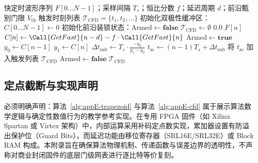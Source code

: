 \begin{algorithm}[!htbp]
\caption{数字恒比定时（CFD）与线性过零插值参考算法}\label{alg:appE-cfd}
\begin{algorithmic}[1]
\Require 快定时波形序列 $F[0 \dots N-1]$；采样间隔 $T_s$；恒比分数 $f$；延迟周期 $d$；前沿甄别门限 $V_{\mathrm{th}}$
\Ensure 触发时刻列表 $\mathcal{T}_{\mathrm{CFD}} = \{t_1, t_2, \dots\}$
\State 初始化双极性缓冲区：$C[0 \dots N-1] \gets 0$
\State 初始化前沿装锁状态：$\mathrm{Armed} \gets \mathbf{false}$
\State $\mathcal{T}_{\mathrm{CFD}} \gets \emptyset$
 
     \State \Return $0.0$ \Else \State \Return $F[n]$ \EndIf
\EndFunction
{}
    \State $C[n] \gets \Call{GetFast}{n - d} - f \cdot \Call{GetFast}{n}$ 
     
        \State $\mathrm{Armed} \gets \mathbf{true}$
    \EndIf
     
        \State $y_0 \gets C[n-1]$
        \State $y_1 \gets C[n]$
        \State $\Delta t_{\mathrm{sub}} \gets T_s \cdot \frac{-y_0}{y_1 - y_0}$ 
        \State $t_{\mathrm{zc}} \gets (n - 1) T_s + \Delta t_{\mathrm{sub}}$
        \State 将 $t_{\mathrm{zc}}$ 加入触发列表 $\mathcal{T}_{\mathrm{CFD}}$
        \State $\mathrm{Armed} \gets \mathbf{false}$ 
    \EndIf
\EndFor
\State \Return $\mathcal{T}_{\mathrm{CFD}}$
\end{algorithmic}
\end{algorithm}

\subsection{定点截断与实现声明}

必须明确声明：算法~\ref{alg:appE-trapezoid} 与算法~\ref{alg:appE-cfd} 属于展示算法数学逻辑与确定性数值行为的教学参考实现。在专用 FPGA 固件（如 Xilinx Spartan 或 Virtex 架构）中，内部运算采用补码定点数实现，累加器设置有防溢出保护位（Guard Bits），而延迟功能由移位寄存器（SRL16E/SRL32E）或 Block RAM 构成。本附录旨在确保算法物理机制、传递函数与误差边界的透明性，不声称对商业封闭固件的底层门级网表进行逐比特等价复刻。
